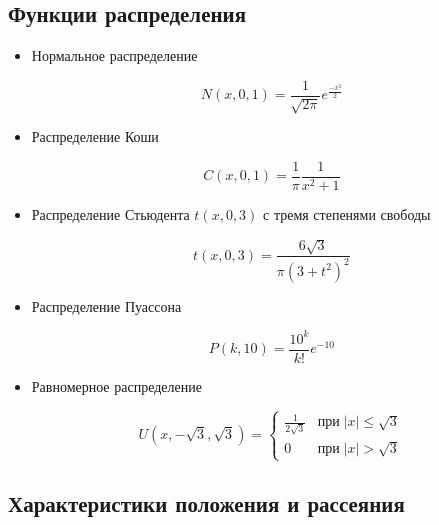 \documentclass[12pt,a4paper]{article}
\begin{document}
	\subsection{Функции распределения}
	\begin{itemize}
		\item Нормальное распределение

		\begin{equation} \label{eq:normal}
			N(x, 0, 1) = \frac{1}{\sqrt{2\pi}}e^\frac{-x^2}{2}
		\end{equation}

		\item Распределение Коши

		\begin{equation} \label{eq:cauchy}
			C(x, 0, 1) = \frac{1}{\pi}\frac{1}{x^2+1}
		\end{equation}

		\item Распределение Стьюдента $t(x, 0, 3)$ с тремя степенями свободы

		\begin{equation} \label{eq:student}
			t(x, 0, 3) = \frac{6\sqrt3}{\pi(3 + t^2)^2}
		\end{equation}

		\item Распределение Пуассона

		\begin{equation} \label{eq:poisson}
			P(k, 10) = \frac{10^k}{k!}e^{-10}
		\end{equation}

		\item Равномерное распределение

		\begin{equation} \label{eq:uniform}
			U(x, -\sqrt3, \sqrt3) = \begin{cases}
				\frac{1}{2\sqrt3} & \mbox{при} \; |x| \leq \sqrt3\\
				0 & \mbox{при} \; |x| > \sqrt3
			\end{cases}
		\end{equation}
	\end{itemize}

	\subsection{Характеристики положения и рассеяния}
\end{document}
